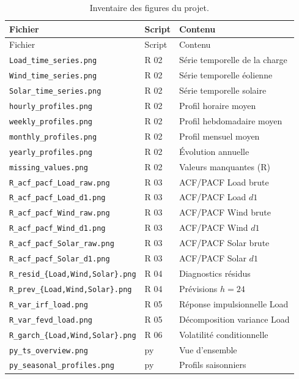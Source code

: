 {\small
\begin{longtable}{lll}
\caption{Inventaire des figures du projet.}
\label{tab:fig_inventory}\\
\toprule
Fichier & Script & Contenu \\
\midrule
\endfirsthead
\toprule
Fichier & Script & Contenu \\
\midrule
\endhead
\bottomrule
\endlastfoot
\texttt{Load\_time\_series.png} & R 02 & Série temporelle de la charge \\
\texttt{Wind\_time\_series.png} & R 02 & Série temporelle éolienne \\
\texttt{Solar\_time\_series.png} & R 02 & Série temporelle solaire \\
\texttt{hourly\_profiles.png} & R 02 & Profil horaire moyen \\
\texttt{weekly\_profiles.png} & R 02 & Profil hebdomadaire moyen \\
\texttt{monthly\_profiles.png} & R 02 & Profil mensuel moyen \\
\texttt{yearly\_profiles.png} & R 02 & Évolution annuelle \\
\texttt{missing\_values.png} & R 02 & Valeurs manquantes (R) \\
\texttt{R\_acf\_pacf\_Load\_raw.png} & R 03 & ACF/PACF Load brute \\
\texttt{R\_acf\_pacf\_Load\_d1.png} & R 03 & ACF/PACF Load $d1$ \\
\texttt{R\_acf\_pacf\_Wind\_raw.png} & R 03 & ACF/PACF Wind brute \\
\texttt{R\_acf\_pacf\_Wind\_d1.png} & R 03 & ACF/PACF Wind $d1$ \\
\texttt{R\_acf\_pacf\_Solar\_raw.png} & R 03 & ACF/PACF Solar brute \\
\texttt{R\_acf\_pacf\_Solar\_d1.png} & R 03 & ACF/PACF Solar $d1$ \\
\texttt{R\_resid\_\{Load,Wind,Solar\}.png} & R 04 & Diagnostics résidus \\
\texttt{R\_prev\_\{Load,Wind,Solar\}.png} & R 04 & Prévisions $h=24$ \\
\texttt{R\_var\_irf\_load.png} & R 05 & Réponse impulsionnelle Load \\
\texttt{R\_var\_fevd\_load.png} & R 05 & Décomposition variance Load \\
\texttt{R\_garch\_\{Load,Wind,Solar\}.png} & R 06 & Volatilité conditionnelle \\
\texttt{py\_ts\_overview.png} & py & Vue d'ensemble \\
\texttt{py\_seasonal\_profiles.png} & py & Profils saisonniers \\

\end{longtable}}

